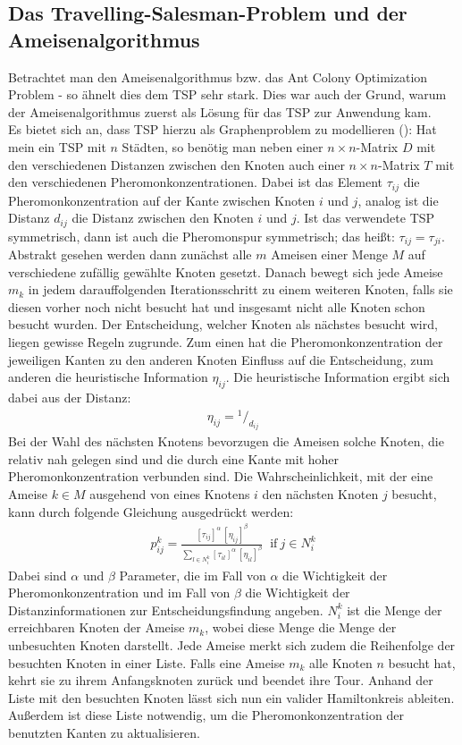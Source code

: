 \documentclass[doktyp=barbeit, sprache=german]{TUBAFarbeiten}
\newcommand*\rfrac[2]{{}^{#1}\!/_{#2}}
\begin{document}
\subsection{Das Travelling-Salesman-Problem und der Ameisenalgorithmus}
Betrachtet man den Ameisenalgorithmus bzw. das Ant Colony Optimization Problem - so ähnelt dies dem TSP sehr stark. Dies war auch der Grund, warum der Ameisenalgorithmus zuerst als Lösung für das TSP zur Anwendung kam.
\\Es bietet sich an, dass TSP hierzu als Graphenproblem zu modellieren (\cite{MaxMin}):
Hat mein ein TSP mit $n$ Städten, so benötig man neben einer $n\times n$-Matrix $D$ mit den verschiedenen Distanzen zwischen den Knoten auch einer $n\times n$-Matrix $T$ mit den verschiedenen Pheromonkonzentrationen. Dabei ist das Element $\tau_{ij}$ die Pheromonkonzentration auf der Kante zwischen Knoten $i$ und $j$, analog ist die Distanz $d_{ij}$ die Distanz zwischen den Knoten $i$ und $j$. Ist das verwendete TSP symmetrisch, dann ist auch die Pheromonspur symmetrisch; das heißt: $\tau_{ij} = \tau_{ji}$.
Abstrakt gesehen werden dann zunächst alle $m$ Ameisen einer Menge $M$ auf verschiedene zufällig gewählte Knoten gesetzt. Danach bewegt sich jede Ameise $m_k$ in jedem darauffolgenden Iterationsschritt zu einem weiteren Knoten, falls sie diesen vorher noch nicht besucht hat und insgesamt nicht alle Knoten schon besucht wurden. Der Entscheidung, welcher Knoten als nächstes besucht wird, liegen gewisse Regeln zugrunde. Zum einen hat die Pheromonkonzentration der jeweiligen Kanten zu den anderen Knoten Einfluss auf die Entscheidung, zum anderen die heuristische Information $\eta_{ij}$. Die heuristische Information ergibt sich dabei aus der Distanz:
\begin{align}
\label{eq:Heuristic}
\eta_{ij} = \rfrac{1}{d_{ij}}
\end{align}
Bei der Wahl des nächsten Knotens bevorzugen die Ameisen solche Knoten, die relativ nah gelegen sind und die durch eine Kante mit hoher Pheromonkonzentration verbunden sind.
Die Wahrscheinlichkeit, mit der eine Ameise $k \in M$ ausgehend von eines Knotens $i$ den nächsten Knoten $j$ besucht, kann durch folgende Gleichung ausgedrückt werden:
\begin{align}
\label{eq:Prob}
p^k_{ij} = \frac{[\tau_{ij}]^\alpha \, [\eta_{ij}]^\beta}{\sum\nolimits_{l\in N^k_i} [\tau_{il}]^\alpha \, [\eta_{il}]^\beta} \; \; \text{if}\: j \in N^k_i
\end{align}
Dabei sind $\alpha$ und $\beta$ Parameter, die im Fall von $\alpha$ die Wichtigkeit der Pheromonkonzentration und im Fall von $\beta$ die Wichtigkeit der Distanzinformationen zur Entscheidungsfindung angeben. $N^k_i$ ist die Menge der erreichbaren Knoten der Ameise $m_k$, wobei diese Menge die Menge der unbesuchten Knoten darstellt. Jede Ameise merkt sich zudem die Reihenfolge der besuchten Knoten in einer Liste. Falls eine Ameise $m_k$ alle Knoten $n$ besucht hat, kehrt sie zu ihrem Anfangsknoten zurück und beendet ihre Tour. Anhand der Liste mit den besuchten Knoten lässt sich nun ein valider Hamiltonkreis ableiten. Außerdem ist diese Liste notwendig, um die Pheromonkonzentration der benutzten Kanten zu aktualisieren.
\end{document}
